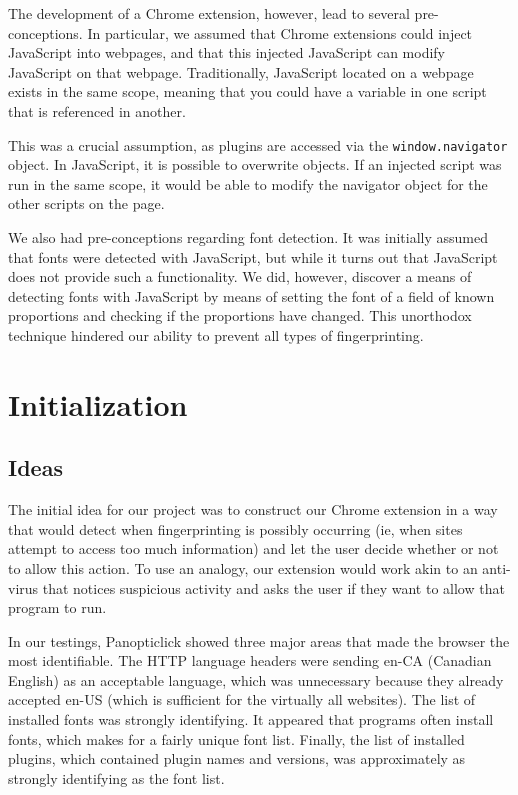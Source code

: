 \documentclass[12pt,a4paper]{article}
\begin{document}
The development of a Chrome extension, however, lead to several pre-conceptions. In particular, we assumed that Chrome extensions could inject JavaScript into webpages, and that this injected JavaScript can modify JavaScript on that webpage. Traditionally, JavaScript located on a webpage exists in the same scope, meaning that you could have a variable in one script that is referenced in another.

This was a crucial assumption, as plugins are accessed via the \texttt{window.navigator} object. In JavaScript, it is possible to overwrite objects. If an injected script was run in the same scope, it would be able to modify the navigator object for the other scripts on the page.

We also had pre-conceptions regarding font detection. It was initially assumed that fonts were detected with JavaScript, but while it turns out that JavaScript does not provide such a functionality. We did, however, discover a means of detecting fonts with JavaScript by means of setting the font of a field of known proportions and checking if the proportions have changed. This unorthodox technique hindered our ability to prevent all types of fingerprinting.

\section{Initialization}

\subsection{Ideas}
The initial idea for our project was to construct our Chrome extension in a way that would detect when fingerprinting is possibly occurring (ie, when sites attempt to access too much information) and let the user decide whether or not to allow this action. To use an analogy, our extension would work akin to an anti-virus that notices suspicious activity and asks the user if they want to allow that program to run.

In our testings, Panopticlick showed three major areas that made the browser the most identifiable. The HTTP language headers were sending en-CA (Canadian English) as an acceptable language, which was unnecessary because they already accepted en-US (which is sufficient for the virtually all websites). The list of installed fonts was strongly identifying. It appeared that programs often install fonts, which makes for a fairly unique font list. Finally, the list of installed plugins, which contained plugin names and versions, was approximately as strongly identifying as the font list.
\end{document}
